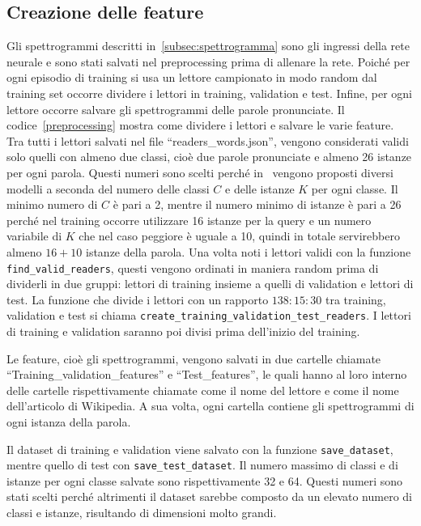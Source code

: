 \documentclass[12pt,a4paper,titlepage]{article}
\begin{document}
\subsection{Creazione delle feature}
\label{subsec:creazione_feature}
Gli spettrogrammi descritti in~\ref{subsec:spettrogramma} sono gli ingressi della rete neurale e sono stati salvati nel preprocessing prima di allenare la rete. Poiché per ogni episodio di training si usa un lettore campionato in modo random dal training set occorre dividere i lettori in training, validation e test. Infine, per ogni lettore occorre salvare gli spettrogrammi delle parole pronunciate. Il codice~\ref{preprocessing} mostra come dividere i lettori e salvare le varie feature. Tra tutti i lettori salvati nel file ``readers\_words.json'', vengono considerati validi solo quelli con almeno due classi, cioè due parole pronunciate e almeno 26 istanze per ogni parola. Questi numeri sono scelti perché in~\cite{salamon:Few-Shot} vengono proposti diversi modelli a seconda del numero delle classi $C$ e delle istanze $K$ per ogni classe. Il minimo numero di $C$ è pari a 2, mentre il numero minimo di istanze è pari a 26 perché nel training occorre utilizzare 16 istanze per la query e un numero variabile di $K$ che nel caso peggiore è uguale a 10, quindi in totale servirebbero almeno $16+10$	 istanze della parola. Una volta noti i lettori validi con la funzione \texttt{find\_valid\_readers}, questi vengono ordinati in maniera random prima di dividerli in due gruppi: lettori di training insieme a quelli di validation e lettori di test. La funzione che divide i lettori con un rapporto $138:15:30$ tra training, validation e test si chiama \texttt{create\_training\_validation\_test\_readers}.
I lettori di training e validation saranno poi divisi prima dell'inizio del training.

Le feature, cioè gli spettrogrammi, vengono salvati in due cartelle chiamate ``Training\_validation\_features'' e ``Test\_features'', le quali hanno al loro interno delle cartelle rispettivamente chiamate come il nome del lettore e come il nome dell'articolo di Wikipedia. A sua volta, ogni cartella contiene gli spettrogrammi di ogni istanza della parola.

Il dataset di training e validation viene salvato con la funzione \texttt{save\_dataset}, mentre quello di test con \texttt{save\_test\_dataset}. Il numero massimo di classi e di istanze per ogni classe salvate sono rispettivamente 32 e 64. Questi numeri sono stati scelti perché altrimenti il dataset sarebbe composto da un elevato numero di classi e istanze, risultando di dimensioni molto grandi.
\end{document}
